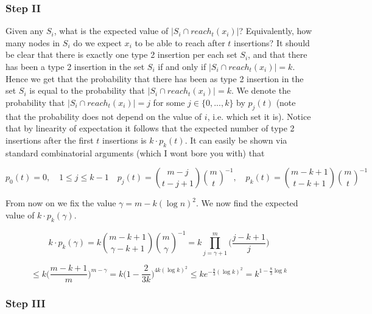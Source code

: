 \documentclass{report}
\begin{document}
\subsubsection{Step II}

Given any $S_{i}$, what is the expected value of $\vert S_{i} \cap reach_t(x_{i})\vert$? Equivalently, how many nodes in $S_{i}$ do we expect $x_{i}$ to be able to reach after $t$ insertions? It should be clear that there is exactly one type 2 insertion per each set $S_{i}$, and that there has been a type 2 insertion in the set $S_{i}$ if and only if $\vert S_{i} \cap reach_t(x_{i})\vert = k$. Hence we get that the probability that there has been as type 2 insertion in the set $S_{i}$ is equal to the probability that $\vert S_{i} \cap reach_t(x_{i})\vert = k$. We denote the probability that $\vert S_{i} \cap reach_t(x_{i})\vert = j$ for some $j \in \{0,...,k\}$ by $p_{j}(t)$ (note that the probability does not depend on the value of $i$, i.e. which set it is). Notice that by linearity of expectation it follows that the expected number of type 2 insertions after the first $t$ insertions is $k \cdot p_k(t)$. It can easily be shown via standard combinatorial arguments (which I wont bore you with) that 

\[ p_{0}(t) = 0,   \quad 1 \leq j \leq k-1 \quad p_{j}(t) = \binom{m-j}{t-j+1}\binom{m}{t}^{-1}, \quad p_{k}(t) = \binom{m-k+1}{t-k+1}\binom{m}{t}^{-1} \]

From now on we fix the value $\gamma=m-k(\log n)^2$. We now find the expected value of $k \cdot p_{k}(\gamma)$.

\[k \cdot p_{k}(\gamma) = k\binom{m-k+1}{\gamma-k+1}\binom{m}{\gamma}^{-1} = k\prod_{j=\gamma + 1}^{m} \bigg( \frac{j-k+1}{j} \bigg) \] 

\[ \leq k \bigg(\frac{m-k+1}{m}\bigg)^{m-\gamma} = k\bigg(1 - \frac{2}{3k}\bigg)^{4k (\log k)^2} \leq ke^{-\frac{8}{3}(\log k)^2} = k^{1-\frac{8}{3}\log k}\] 

\subsubsection{Step III}
\end{document}
